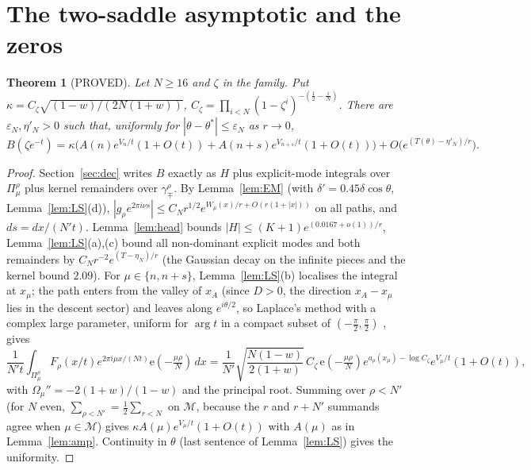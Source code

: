 \documentclass[11pt]{article}
\newtheorem{theorem}{Theorem}\newtheorem{lemma}[theorem]{Lemma}\newtheorem{proposition}[theorem]{Proposition}
\theoremstyle{definition}\newtheorem{definition}[theorem]{Definition}
\theoremstyle{remark}\newtheorem{remark}[theorem]{Remark}
\newcommand{\e}{\mathrm{e}}
\begin{document}
\section{The two-saddle asymptotic and the zeros}\label{sec:main}
\begin{theorem}[PROVED]\label{thm:asym}
Let $N\ge16$ and $\zeta$ in the family. Put $\kappa=C_\zeta\sqrt{(1-w)/(2N(1+w))}$, $C_\zeta=\prod_{i<N}(1-\zeta^i)^{-(\frac12-\frac iN)}$. There are $\varepsilon_N,\eta'_N>0$ such that, uniformly for $|\theta-\theta^*|\le\varepsilon_N$ as $r\to0$,
\[B(\zeta e^{-t})=\kappa\big(A(n)e^{V_n/t}(1+O(t))+A(n+s)e^{V_{n+s}/t}(1+O(t))\big)+O\big(e^{(T(\theta)-\eta'_N)/r}\big).\]
\end{theorem}
\begin{proof}
Section~\ref{sec:dec} writes $B$ exactly as $H$ plus explicit-mode integrals over $\Pi^\rho_\mu$ plus kernel remainders over $\gamma^\rho_\mp$. By Lemma~\ref{lem:EM} (with $\delta'=0.45\delta\cos\theta$, Lemma~\ref{lem:LS}(d)), $|g_\rho e^{2\pi i\nu s}|\le C_Nr^{1/2}e^{W_\mu(x)/r+O(r(1+|x|))}$ on all paths, and $ds=dx/(N't)$. Lemma~\ref{lem:head} bounds $|H|\le(K+1)e^{(0.0167+o(1))/r}$, Lemma~\ref{lem:LS}(a),(c) bound all non-dominant explicit modes and both remainders by $C_Nr^{-2}e^{(T-\eta_N)/r}$ (the Gaussian decay on the infinite pieces and the kernel bound $2.09$). For $\mu\in\{n,n+s\}$, Lemma~\ref{lem:LS}(b) localises the integral at $x_\mu$; the path enters from the valley of $x_A$ (since $D>0$, the direction $x_A-x_\mu$ lies in the descent sector) and leaves along $e^{i\theta/2}$, so Laplace's method with a complex large parameter, uniform for $\arg t$ in a compact subset of $(-\frac\pi2,\frac\pi2)$ \cite{Olver1974}, gives
\[\frac1{N't}\int_{\Pi^\rho_\mu}F_\rho(x/t)e^{2\pi i\mu x/(Nt)}\e(-\tfrac{\mu\rho}N)\,dx=\frac1{N'}\sqrt{\frac{N(1-w)}{2(1+w)}}\,C_\zeta\,\e(-\tfrac{\mu\rho}N)e^{a_\rho(x_\mu)-\log C_\zeta}e^{V_\mu/t}(1+O(t)),\]
with $\Omega_\mu''=-2(1+w)/(1-w)$ and the principal root. Summing over $\rho<N'$ (for $N$ even, $\sum_{\rho<N'}=\frac12\sum_{r<N}$ on $\mathcal M$, because the $r$ and $r+N'$ summands agree when $\mu\in\mathcal M$) gives $\kappa A(\mu)e^{V_\mu/t}(1+O(t))$ with $A(\mu)$ as in Lemma~\ref{lem:amp}. Continuity in $\theta$ (last sentence of Lemma~\ref{lem:LS}) gives the uniformity.
\end{proof}
\end{document}

